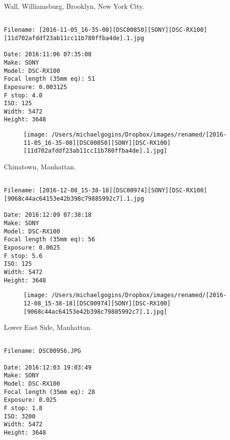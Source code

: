 \documentclass[11pt,letter,DIV=14,paper=landscape]{scrbook}
\begin{document}
\clearpage
\noindent Wall, Williamsburg, Brooklyn, New York City.
\noindent
\begin{lstlisting}

Filename: [2016-11-05_16-35-08][DSC00850][SONY][DSC-RX100][11d702afddf23ab11cc11b780ffba4de].1.jpg

Date: 2016:11:06 07:35:08
Make: SONY
Model: DSC-RX100
Focal length (35mm eq): 51
Exposure: 0.003125
F stop: 4.0
ISO: 125
Width: 5472
Height: 3648
\end{lstlisting}
\clearpage

\begin{figure}
\texttt{[image: /Users/michaelgogins/Dropbox/images/renamed/[2016-11-05\_16-35-08][DSC00850][SONY][DSC-RX100][11d702afddf23ab11cc11b780ffba4de].1.jpg]}
\end{figure}
    
\clearpage
\noindent Chinatown, Manhattan.
\noindent
\begin{lstlisting}

Filename: [2016-12-08_15-38-18][DSC00974][SONY][DSC-RX100][9068c44ac64153e42b398c79885992c7].1.jpg

Date: 2016:12:09 07:38:18
Make: SONY
Model: DSC-RX100
Focal length (35mm eq): 56
Exposure: 0.0025
F stop: 5.6
ISO: 125
Width: 5472
Height: 3648
\end{lstlisting}
\clearpage

\begin{figure}
\texttt{[image: /Users/michaelgogins/Dropbox/images/renamed/[2016-12-08\_15-38-18][DSC00974][SONY][DSC-RX100][9068c44ac64153e42b398c79885992c7].1.jpg]}
\end{figure}
    
\clearpage
\noindent Lower East Side, Manhattan.
\noindent
\begin{lstlisting}

Filename: DSC00956.JPG

Date: 2016:12:03 19:03:49
Make: SONY
Model: DSC-RX100
Focal length (35mm eq): 28
Exposure: 0.025
F stop: 1.8
ISO: 3200
Width: 5472
Height: 3648
\end{lstlisting}
\clearpage
\end{document}

